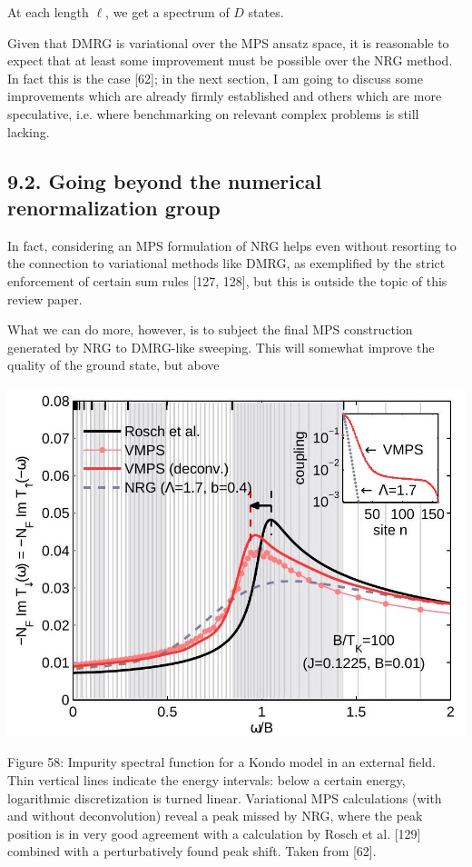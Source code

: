 \documentclass[12pt]{article}
\begin{document}
At each length $\ell$, we get a spectrum of $D$ states.

Given that DMRG is variational over the MPS ansatz space, it is reasonable to expect that at least some improvement must be possible over the NRG method. In fact this is the case [62]; in the next section, I am going to discuss some improvements which are already firmly established and others which are more speculative, i.e. where benchmarking on relevant complex problems is still lacking.

\subsection*{9.2. Going beyond the numerical renormalization group}
In fact, considering an MPS formulation of NRG helps even without resorting to the connection to variational methods like DMRG, as exemplified by the strict enforcement of certain sum rules [127, 128], but this is outside the topic of this review paper.

What we can do more, however, is to subject the final MPS construction generated by NRG to DMRG-like sweeping. This will somewhat improve the quality of the ground state, but above

\begin{center}
\includegraphics[max width=\textwidth]{2024_05_04_afc4ad226da9ccfe0ac8g-104}
\end{center}

Figure 58: Impurity spectral function for a Kondo model in an external field. Thin vertical lines indicate the energy intervals: below a certain energy, logarithmic discretization is turned linear. Variational MPS calculations (with and without deconvolution) reveal a peak missed by NRG, where the peak position is in very good agreement with a calculation by Rosch et al. [129] combined with a perturbatively found peak shift. Taken from [62].
\end{document}
